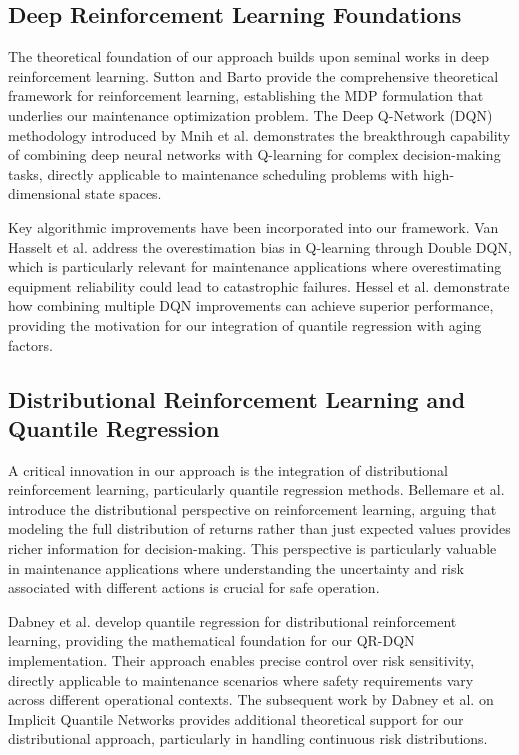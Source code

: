 \documentclass[twocolumn]{article}
\begin{document}
\subsection{Deep Reinforcement Learning Foundations}

The theoretical foundation of our approach builds upon seminal works in deep reinforcement learning. Sutton and Barto\cite{sutton2018reinforcement} provide the comprehensive theoretical framework for reinforcement learning, establishing the MDP formulation that underlies our maintenance optimization problem. The Deep Q-Network (DQN) methodology introduced by Mnih et al.\cite{mnih2015human} demonstrates the breakthrough capability of combining deep neural networks with Q-learning for complex decision-making tasks, directly applicable to maintenance scheduling problems with high-dimensional state spaces.

Key algorithmic improvements have been incorporated into our framework. Van Hasselt et al.\cite{vanhasselt2016double} address the overestimation bias in Q-learning through Double DQN, which is particularly relevant for maintenance applications where overestimating equipment reliability could lead to catastrophic failures. Hessel et al.\cite{hessel2018rainbow} demonstrate how combining multiple DQN improvements can achieve superior performance, providing the motivation for our integration of quantile regression with aging factors.

\subsection{Distributional Reinforcement Learning and Quantile Regression}

A critical innovation in our approach is the integration of distributional reinforcement learning, particularly quantile regression methods. Bellemare et al.\cite{bellemare2017distributional} introduce the distributional perspective on reinforcement learning, arguing that modeling the full distribution of returns rather than just expected values provides richer information for decision-making. This perspective is particularly valuable in maintenance applications where understanding the uncertainty and risk associated with different actions is crucial for safe operation.

Dabney et al.\cite{dabney2018qr} develop quantile regression for distributional reinforcement learning, providing the mathematical foundation for our QR-DQN implementation. Their approach enables precise control over risk sensitivity, directly applicable to maintenance scenarios where safety requirements vary across different operational contexts. The subsequent work by Dabney et al.\cite{dabney2018iqn} on Implicit Quantile Networks provides additional theoretical support for our distributional approach, particularly in handling continuous risk distributions.
\end{document}
